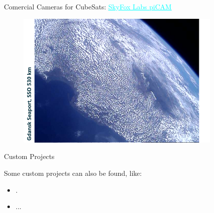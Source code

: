 \begin{frame}{Comercial Cameras for CubeSats: \href{https://www.skyfoxlabs.com/product/27-digital-cubesat-camera}{\textcolor{cyan}{\underline{SkyFox Labs piCAM}}}}

    \begin{figure}[!ht]
        \begin{center}
            \includegraphics[width=10cm]{figures/picam-ex3}
        \end{center}
    \end{figure}

\end{frame}


\begin{frame}{Custom Projects}

    Some custom projects can also be found, like:

    \begin{itemize}
        \item .
        \item ...
    \end{itemize}

\end{frame}


